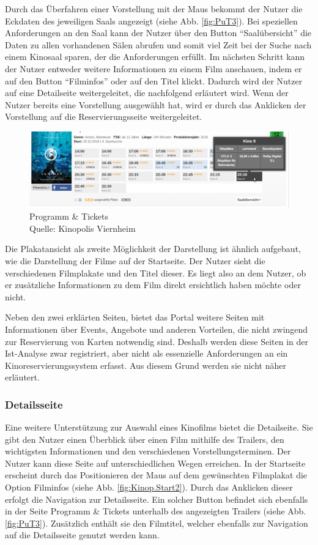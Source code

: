 	Durch das Überfahren einer Vorstellung mit der Maus bekommt der Nutzer die Eckdaten des jeweiligen Saals angezeigt (siehe Abb. \vref{fig:PuT3}). Bei speziellen Anforderungen an den Saal kann der Nutzer über den Button \enquote{Saalübersicht} die Daten zu allen vorhandenen Sälen abrufen und somit viel Zeit bei der Suche nach einem Kinosaal sparen, der die Anforderungen erfüllt. Im nächsten Schritt kann der Nutzer entweder weitere Informationen zu einem Film anschauen, indem er auf den Button \enquote{Filminfos} oder auf den Titel klickt. Dadurch wird der Nutzer auf eine Detailseite weitergeleitet, die nachfolgend erläutert wird. Wenn der Nutzer bereits eine Vorstellung ausgewählt hat, wird er durch das Anklicken der Vorstellung auf die Reservierungsseite weitergeleitet. 
	\begin{figure}[H]
		\centering 
		\includegraphics[width=14cm]{img/PuT_3.png}
		\captionsetup{format=hang}
		\centering\caption[Programm \& Tickets 3]{\label{fig:PuT3}Programm \& Tickets \\Quelle: Kinopolis Viernheim}
	\end{figure}
	
	Die Plakatansicht als zweite Möglichkeit der Darstellung ist ähnlich aufgebaut, wie die Darstellung der Filme auf der Startseite. Der Nutzer sieht die verschiedenen Filmplakate und den Titel dieser. Es liegt also an dem Nutzer, ob er zusätzliche Informationen zu dem Film direkt ersichtlich haben möchte oder nicht.  
	
	Neben den zwei erklärten Seiten, bietet das Portal weitere Seiten mit Informationen über Events, Angebote und anderen Vorteilen, die nicht zwingend zur Reservierung von Karten notwendig sind. Deshalb werden diese Seiten in der Ist-Analyse zwar registriert, aber nicht als essenzielle Anforderungen an ein Kinoreservierungssystem erfasst. Aus diesem Grund werden sie nicht näher erläutert.
	
	\subsubsection{Detailsseite}
	Eine weitere Unterstützung zur Auswahl eines Kinofilms bietet die Detailseite. Sie gibt den Nutzer einen Überblick über einen Film mithilfe des Trailers, den wichtigsten Informationen und den verschiedenen Vorstellungsterminen. Der Nutzer kann diese Seite auf unterschiedlichen Wegen erreichen. In der Startseite erscheint durch das Positionieren der Maus auf dem gewünschten Filmplakat die Option Filminfos (siehe Abb. \vref{fig:Kinop.Start2}). Durch das Anklicken dieser erfolgt die Navigation zur Detailsseite. Ein solcher Button befindet sich ebenfalls in der Seite Programm \& Tickets unterhalb des angezeigten Trailers (siehe Abb. \vref{fig:PuT3}). Zusätzlich enthält sie den Filmtitel, welcher ebenfalls zur Navigation auf die Detailsseite genutzt werden kann. 
	
